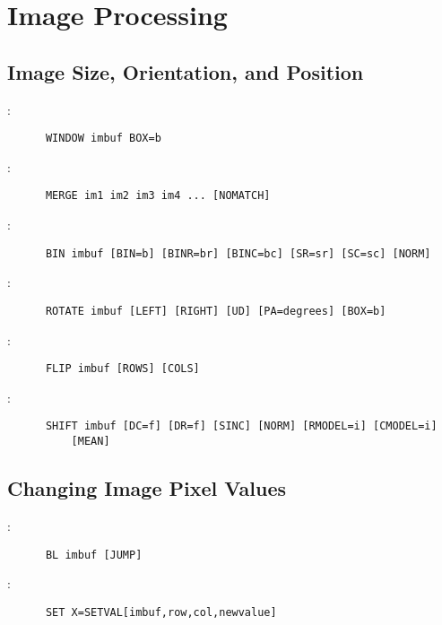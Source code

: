 
\section{Image Processing}

\subsection{Image Size, Orientation, and Position}

:
\begin{verbatim}
      WINDOW imbuf BOX=b
\end{verbatim}

\noindent {}:
\begin{verbatim}
      MERGE im1 im2 im3 im4 ... [NOMATCH]
\end{verbatim}

\noindent {}:
\begin{verbatim}
      BIN imbuf [BIN=b] [BINR=br] [BINC=bc] [SR=sr] [SC=sc] [NORM]
\end{verbatim}

\noindent {}:
\begin{verbatim}
      ROTATE imbuf [LEFT] [RIGHT] [UD] [PA=degrees] [BOX=b]
\end{verbatim}

\noindent {}:
\begin{verbatim}
      FLIP imbuf [ROWS] [COLS]
\end{verbatim}

\noindent {}:
\begin{verbatim}
      SHIFT imbuf [DC=f] [DR=f] [SINC] [NORM] [RMODEL=i] [CMODEL=i]
		  [MEAN]
\end{verbatim}

\subsection{Changing Image Pixel Values}

:
\begin{verbatim}
      BL imbuf [JUMP]
\end{verbatim}

\noindent {}:
\begin{verbatim}
      SET X=SETVAL[imbuf,row,col,newvalue]
\end{verbatim}

